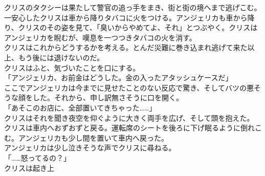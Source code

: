 \documentclass[b5j,10pt,openany]{jsbook}
\begin{document}
クリスのタクシーは果たして警官の追っ手をまき、街と街の境へまで逃げこむ。\\一安心したクリスは車から降りタバコに火をつける。アンジェリカも車から降り、クリスのその姿を見て、「臭いからやめてよ、それ」とつぶやく。クリスはアンジェリカを睨むが、嘆息を一つつきタバコの火を消す。\\クリスはこれからどうするかを考える。とんだ災難に巻き込まれ逃げて来た以上、もう後には退けないのだ。\\クリスはふと、気づいたことを口にする。\\「アンジェリカ、お前金はどうした。金の入ったアタッシュケースだ」\\ここでアンジェリカは今までに見せたことのない反応で驚き、そしてバツの悪そうな顔をした。それから、申し訳無さそうに口を開く。\\「あそこのお店に、全部置いてきちゃった\ldots{}\ldots{}」\\クリスはそれを聞き夜空を仰ぐように大きく両手を広げ、そして頭を抱えた。\\クリスは車内へおずおずと戻る。運転席のシートを後ろに下げ眠るように倒れこむ。アンジェリカも少し間を置いて車内へ戻った。\\アンジェリカは少し泣きそうな声でクリスに尋ねる。\\「\ldots{}\ldots{}怒ってるの？」\\クリスは起き上
\end{document}
